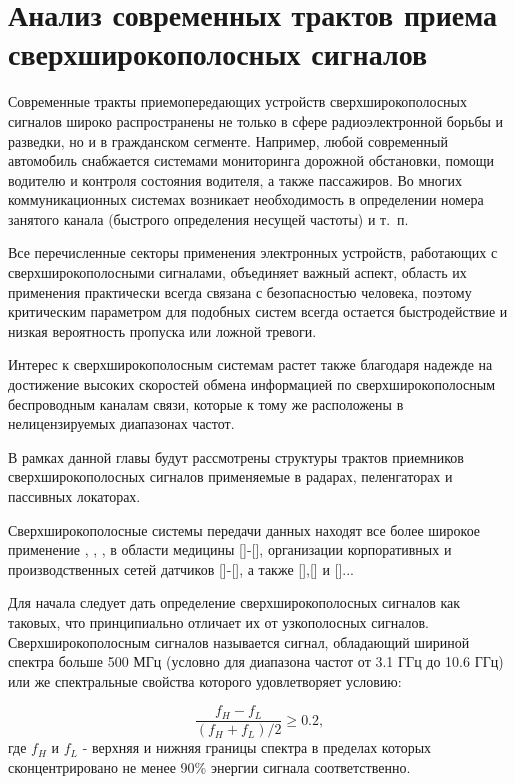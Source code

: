 \chapter{Анализ современных трактов приема сверхширокополосных сигналов}

Современные тракты приемопередающих устройств сверхширокополосных сигналов широко распространены не только в сфере радиоэлектронной борьбы и разведки, но и в гражданском сегменте. Например, любой современный автомобиль снабжается системами мониторинга дорожной обстановки, помощи водителю и контроля состояния водителя, а также пассажиров. Во многих коммуникационных системах возникает необходимость в определении номера занятого канала (быстрого определения несущей частоты) и т.~п.

Все перечисленные секторы применения электронных устройств, работающих с сверхширокополосными сигналами, объединяет важный аспект, область их применения практически всегда связана с безопасностью человека, поэтому критическим параметром для подобных систем всегда остается быстродействие и низкая вероятность пропуска или ложной тревоги.

Интерес к сверхширокополосным системам растет также благодаря надежде на достижение высоких скоростей обмена информацией по сверхширокополосным беспроводным каналам связи, которые к тому же расположены в нелицензируемых диапазонах частот.

В рамках данной главы будут рассмотрены структуры трактов приемников сверхширокополосных сигналов применяемые в радарах, пеленгаторах и пассивных локаторах.

Сверхширокополосные системы передачи данных находят все более широкое применение \cite{wosbib1}, \cite{vakbib1}, \cite{vakbib2}, \cite{scbib1} в области медицины []-[], организации корпоративных и производственных сетей датчиков []-[], а также [],[] и []...

Для начала следует дать определение сверхширокополосных сигналов как таковых, что принципиально отличает их от узкополосных сигналов. Сверхширокополосным сигналов называется сигнал, обладающий шириной спектра больше 500 МГц (условно для диапазона частот от 3.1 ГГц до 10.6 ГГц) или же спектральные свойства которого удовлетворяет условию:

\begin{equation*}
\frac{f_H - f_L}{(f_H + f_L)/2} \geqslant 0.2 ,
\label{eq:ubw_condition}
\end{equation*}
где \(f_H\) и \(f_L\) - верхняя и нижняя границы спектра в пределах которых сконцентрировано не менее 90\% энергии сигнала соответственно.

